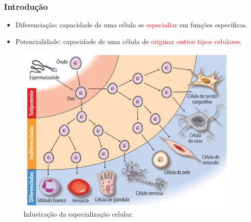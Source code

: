 \documentclass[brazil]{beamer}
\begin{document}
  \begin{frame}
  \frametitle{Introdução}
    \raggedright  
    \begin{itemize}
     \item Diferenciação: capacidade de uma célula se \textcolor{red}{especialiar} em funções especificas.
     \item Potencialidade: capacidade de uma célula de \textcolor{red}{originar outros tipos celulares}.
    \end{itemize}
    \begin{figure}
     \includegraphics[scale=0.2]{diferenciacao_potencialidade.jpg}
	  \caption{\tiny Inlustração da especialização celular.}
    \end{figure} 
  \end{frame}
\end{document}

